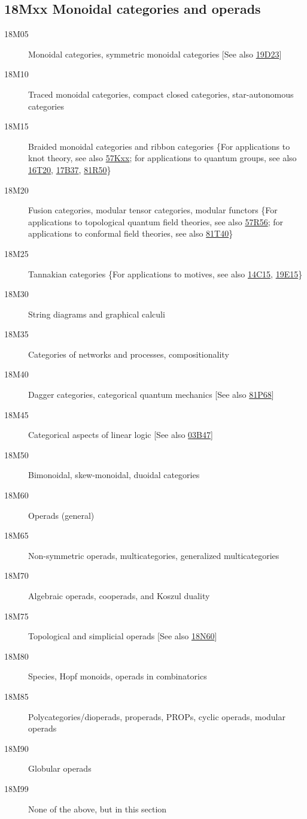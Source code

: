 \documentclass[letterpaper]{article}
\begin{document}
\subsection*{18Mxx Monoidal categories and operads}\label{18Mxx}
\begin{description} 
\item [18M05]\label{18M05} Monoidal categories, symmetric monoidal categories [See also \hyperref[19D23]{19D23}]
\item [18M10]\label{18M10} Traced monoidal categories, compact closed categories, star-autonomous categories 
\item [18M15]\label{18M15} Braided monoidal categories and ribbon categories \{For applications to knot theory, see also \hyperref[57Kxx]{57Kxx}; for applications to quantum groups, see also \hyperref[16T20]{16T20}, \hyperref[17B37]{17B37}, \hyperref[81R50]{81R50}\}
\item [18M20]\label{18M20} Fusion categories, modular tensor categories, modular functors \{For applications to topological quantum field theories, see also \hyperref[57R56]{57R56}; for applications to conformal field theories, see also \hyperref[81T40]{81T40}\}
\item [18M25]\label{18M25} Tannakian categories \{For applications to motives, see also \hyperref[14C15]{14C15}, \hyperref[19E15]{19E15}\}
\item [18M30]\label{18M30} String diagrams and graphical calculi
\item [18M35]\label{18M35} Categories of networks and processes, compositionality
\item [18M40]\label{18M40} Dagger categories, categorical quantum mechanics [See also \hyperref[81P68]{81P68}]
\item [18M45]\label{18M45} Categorical aspects of linear logic [See also \hyperref[03B47]{03B47}]
\item [18M50]\label{18M50} Bimonoidal, skew-monoidal, duoidal categories
\item [18M60]\label{18M60} Operads (general)
\item [18M65]\label{18M65} Non-symmetric operads, multicategories, generalized multicategories
\item [18M70]\label{18M70} Algebraic operads, cooperads, and Koszul duality
\item [18M75]\label{18M75} Topological and simplicial operads [See also \hyperref[18N60]{18N60}]
\item [18M80]\label{18M80} Species, Hopf monoids, operads in combinatorics
\item [18M85]\label{18M85} Polycategories/dioperads, properads, PROPs, cyclic operads, modular operads
\item [18M90]\label{18M90} Globular operads
\item [18M99]\label{18M99} None of the above, but in this section
\end{description}
\end{document}
